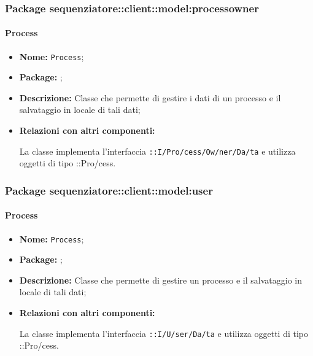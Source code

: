 \subsubsection{Package sequenziatore::client::model:processowner}
\paragraph{Process}
\begin{flushleft}
\begin{itemize}
\item \textbf{Nome:} \texttt{Process};
\item \textbf{Package:} \texttt{\modelAdmin{}};
\item \textbf{Descrizione:} Classe che permette di gestire i dati di un processo e il salvataggio in locale di tali dati;
\item \textbf{Relazioni con altri componenti:}
\begin{sloppypar}
La classe implementa l'interfaccia \texttt{\iModelAdmin{}::I\fshyp{}Pro\fshyp{}cess\fshyp{}Ow\fshyp{}ner\fshyp{}Da\fshyp{}ta} e utilizza oggetti di tipo \texttt{\model{}}::Pro\fshyp{}cess.
\end{sloppypar}
\end{itemize}
\end{flushleft}

\subsubsection{Package sequenziatore::client::model:user}
\paragraph{Process}
\begin{flushleft}
\begin{itemize}
\item \textbf{Nome:} \texttt{Process};
\item \textbf{Package:} \texttt{\modelUser{}};
\item \textbf{Descrizione:} Classe che permette di gestire un processo e il salvataggio in locale di tali dati;
\item \textbf{Relazioni con altri componenti:}
\begin{sloppypar}
La classe implementa l'interfaccia \texttt{\iModelUser{}::I\fshyp{}U\fshyp{}ser\fshyp{}Da\fshyp{}ta} e utilizza oggetti di tipo \texttt{\model{}}::Pro\fshyp{}cess.
\end{sloppypar}
\end{itemize}
\end{flushleft}